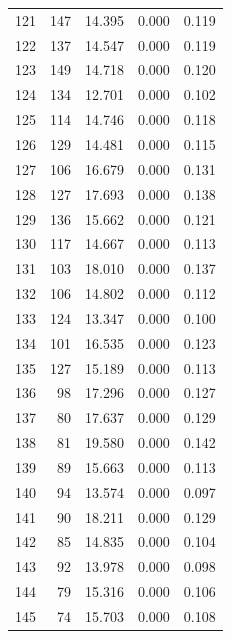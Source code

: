 \begin{table}
\begin{tabular}{rrrrr}
 121 &    147 &         14.395 &        0.000 &           0.119 \\
 122 &    137 &         14.547 &        0.000 &           0.119 \\
 123 &    149 &         14.718 &        0.000 &           0.120 \\
 124 &    134 &         12.701 &        0.000 &           0.102 \\
 125 &    114 &         14.746 &        0.000 &           0.118 \\
 126 &    129 &         14.481 &        0.000 &           0.115 \\
 127 &    106 &         16.679 &        0.000 &           0.131 \\
 128 &    127 &         17.693 &        0.000 &           0.138 \\
 129 &    136 &         15.662 &        0.000 &           0.121 \\
 130 &    117 &         14.667 &        0.000 &           0.113 \\
 131 &    103 &         18.010 &        0.000 &           0.137 \\
 132 &    106 &         14.802 &        0.000 &           0.112 \\
 133 &    124 &         13.347 &        0.000 &           0.100 \\
 134 &    101 &         16.535 &        0.000 &           0.123 \\
 135 &    127 &         15.189 &        0.000 &           0.113 \\
 136 &     98 &         17.296 &        0.000 &           0.127 \\
 137 &     80 &         17.637 &        0.000 &           0.129 \\
 138 &     81 &         19.580 &        0.000 &           0.142 \\
 139 &     89 &         15.663 &        0.000 &           0.113 \\
 140 &     94 &         13.574 &        0.000 &           0.097 \\
 141 &     90 &         18.211 &        0.000 &           0.129 \\
 142 &     85 &         14.835 &        0.000 &           0.104 \\
 143 &     92 &         13.978 &        0.000 &           0.098 \\
 144 &     79 &         15.316 &        0.000 &           0.106 \\
 145 &     74 &         15.703 &        0.000 &           0.108 \\

\end{tabular}
\end{table}
